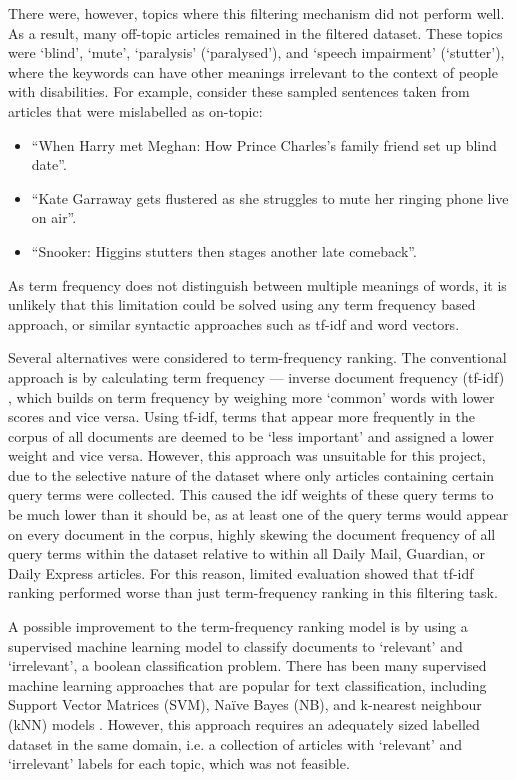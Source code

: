 \documentclass{report}
\begin{document}
There were, however, topics where this filtering mechanism did not perform well.
As a result, many off-topic articles remained in the filtered dataset.
These topics were `blind', `mute', `paralysis' (`paralysed'), and `speech impairment' (`stutter'), where the keywords can have other meanings irrelevant to the context of people with disabilities.
For example, consider these sampled sentences taken from articles that were mislabelled as on-topic:
\begin{itemize}
	\item ``When Harry met Meghan: How Prince Charles's family friend set up blind date''.
	\item ``Kate Garraway gets flustered as she struggles to mute her ringing phone live on air''.
	\item ``Snooker: Higgins stutters then stages another late comeback''.
\end{itemize}

As term frequency does not distinguish between multiple meanings of words, it is unlikely that this limitation could be solved using any term frequency based approach, or similar syntactic approaches such as tf-idf and word vectors.

Several alternatives were considered to term-frequency ranking.
The conventional approach is by calculating term frequency --- inverse document frequency (tf-idf) \cite{robertson2004understanding, sparck1972statistical}, which builds on term frequency by weighing more `common' words with lower scores and vice versa.
Using tf-idf, terms that appear more frequently in the corpus of all documents are deemed to be `less important' and assigned a lower weight and vice versa.
However, this approach was unsuitable for this project, due to the selective nature of the dataset where only articles containing certain query terms were collected. 
This caused the idf weights of these query terms to be much lower than it should be, as at least one of the query terms would appear on every document in the corpus, highly skewing the document frequency of all query terms within the dataset relative to within all Daily Mail, Guardian, or Daily Express articles.
For this reason, limited evaluation showed that tf-idf ranking performed worse than just term-frequency ranking in this filtering task.

A possible improvement to the term-frequency ranking model is by using a supervised machine learning model to classify documents to `relevant' and `irrelevant', a boolean classification problem.
There has been many supervised machine learning approaches that are popular for text classification, including Support Vector Matrices (SVM), Na\"{i}ve Bayes (NB), and k-nearest neighbour (kNN) models \cite{khan2010review}.
However, this approach requires an adequately sized labelled dataset in the same domain, i.e. a collection of articles with `relevant' and `irrelevant' labels for each topic, which was not feasible.
\end{document}
